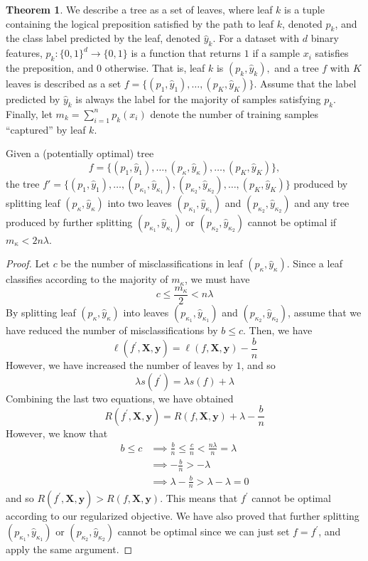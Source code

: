 \documentclass{article}
\theoremstyle{definition}
\newtheorem{theorem}{Theorem}[section]
\theoremstyle{remark}
\theoremstyle{definition}
\begin{document}
\begin{theorem}
We describe a tree as a set of leaves, where leaf $k$ is a tuple containing the logical preposition satisfied by the path to leaf $k$, denoted $p_k $, and the class label predicted by the leaf, denoted $\hat{y}_k$. For a dataset with $d$ binary features, $p_k: \{0, 1\}^d \to \{0, 1\}$ is a function that returns $1$ if a sample $x_i$ satisfies the preposition, and $0$ otherwise. That is, leaf $k$ is $(p_k, \hat{y}_k),$ and a tree $f$ with $K$ leaves is described as a set $f = \{(p_1, \hat{y}_1), \hdots, (p_K, \hat{y}_K)\}$. Assume that the label predicted by $\hat{y}_k$ is always the label for the majority of samples satisfying $p_k$. Finally, let $m_k = \sum_{i=1}^n p_k(x_i)$ denote the number of training samples ``captured'' by leaf $k$.

Given a (potentially optimal) tree $$f = \{(p_1, \hat{y}_1), \hdots, (p_{\kappa}, \hat{y}_{\kappa}), \hdots, (p_K, \hat{y}_K)\},$$ 
the tree $f' = \{(p_1, \hat{y}_1), \hdots, (p_{\kappa_1}, \hat{y}_{\kappa_1}), (p_{\kappa_2}, \hat{y}_{\kappa_2}), \hdots, (p_K, \hat{y}_K)\}$ 
produced by splitting leaf $(p_{\kappa}, \hat{y}_{\kappa})$ into two leaves $(p_{\kappa_1}, \hat{y}_{\kappa_1})$ and $(p_{\kappa_2}, \hat{y}_{\kappa_2})$ and any tree produced by further splitting $(p_{\kappa_1}, \hat{y}_{\kappa_1})$ or $(p_{\kappa_2}, \hat{y}_{\kappa_2})$ cannot  be optimal if $m_{\kappa} < 2n\lambda$.
\end{theorem}
\begin{proof}
Let $c$ be the number of misclassifications in leaf $(p_{\kappa}, \hat{y}_{\kappa})$. Since a leaf classifies according to the majority of $m_{\kappa}$, we must have 
\[c \leq \frac{m_\kappa}{2} < n \lambda\]
By splitting leaf $(p_\kappa, \hat{y}_\kappa)$ into leaves $(p_{\kappa_1}, \hat{y}_{\kappa_1})$ and $(p_{\kappa_2}, \hat{y}_{\kappa_2})$, assume that we have reduced the number of misclassifications by $b \leq c$. Then, we have 
\[\ell(f^\prime, \mathbf{X}, \mathbf{y}) = \ell(f, \mathbf{X}, \mathbf{y}) - \frac{b}{n}\]
However, we have increased the number of leaves by $1$, and so 
\[\lambda s(f^\prime) = \lambda s(f) + \lambda\]
Combining the last two equations, we have obtained 
\[R (f^\prime, \mathbf{X}, \mathbf{y}) = R(f, \mathbf{X}, \mathbf{y}) + \lambda - \frac{b}{n}\]
However, we know that 
\begin{align*}
    b \leq c & \implies \frac{b}{n} \leq \frac{c}{n} < \frac{n \lambda}{n} = \lambda \\
    & \implies - \frac{b}{n} > - \lambda \\
    & \implies \lambda - \frac{b}{n} > \lambda - \lambda = 0
\end{align*}
and so $R (f^\prime, \mathbf{X}, \mathbf{y}) > R(f, \mathbf{X}, \mathbf{y})$. This means that $f^\prime$ cannot be optimal according to our regularized objective. We have also proved that further splitting $(p_{\kappa_1}, \hat{y}_{\kappa_1})$ or $(p_{\kappa_2}, \hat{y}_{\kappa_2})$ cannot  be optimal since we can just set $f = f^\prime$, and apply the same argument. 
\end{proof}
\end{document}
